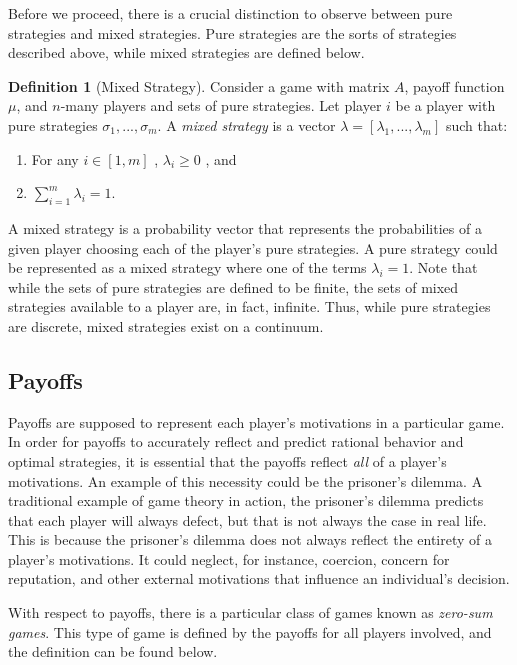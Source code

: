 \documentclass[12pt]{article}
\theoremstyle{definition}
\newtheorem{definition}[theorem]{Definition}
\theoremstyle{remark}
\begin{document}
Before we proceed, there is a crucial distinction to observe between pure strategies and mixed strategies. Pure strategies are the sorts of strategies described above, while mixed strategies are defined below.

\begin{definition}[Mixed Strategy]
Consider a game with matrix $A$, payoff function $\mu$, and $n$-many players and sets of pure strategies. Let player $i$ be a player with pure strategies $\sigma_1 , ... , \sigma_m$.
A \emph{mixed strategy} is a vector $\lambda = [\lambda_1 , ... , \lambda_m]$ such that:
\begin{enumerate}
	\item{For any $i \in [1,m]$ , $\lambda_i \geq 0$ , and}
	\item{$\sum_{i=1}^m \lambda_i = 1$.}
\end{enumerate}
\end{definition}

A mixed strategy is a probability vector that represents the probabilities of a given player choosing each of the player's pure strategies. A pure strategy could be represented as a mixed strategy where one of the terms $\lambda_i = 1$.
Note that while the sets of pure strategies are defined to be finite, the sets of mixed strategies available to a player are, in fact, infinite. Thus, while pure strategies are discrete, mixed strategies exist on a continuum.



\subsection{Payoffs}

Payoffs are supposed to represent each player's motivations in a particular game. In order for payoffs to accurately reflect and predict rational behavior and optimal strategies, it is essential that the payoffs reflect \emph{all} of a player's motivations. An example of this necessity could be the prisoner's dilemma.
A traditional example of game theory in action, the prisoner's dilemma predicts that each player will always defect, but that is not always the case in real life. This is because the prisoner's dilemma does not always reflect the entirety of a player's motivations. It could neglect, for instance, coercion, concern for reputation,
and other external motivations that influence an individual's decision.

With respect to payoffs, there is a particular class of games known as \emph{zero-sum games}. This type of game is defined by the payoffs for all players involved, and the definition can be found below.
\end{document}
